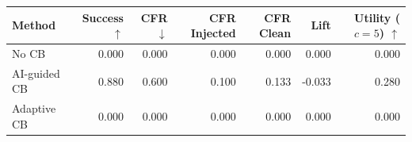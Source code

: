 \begin{tabular}{lrrrrrr}
\toprule
Method & Success $\uparrow$ & CFR $\downarrow$ & CFR Injected & CFR Clean & Lift & Utility ($c=5$) $\uparrow$ \\
\midrule
No CB & 0.000 & 0.000 & 0.000 & 0.000 & 0.000 & 0.000 \\
AI-guided CB & 0.880 & 0.600 & 0.100 & 0.133 & -0.033 & 0.280 \\
Adaptive CB & 0.000 & 0.000 & 0.000 & 0.000 & 0.000 & 0.000 \\
\bottomrule
\end{tabular}

